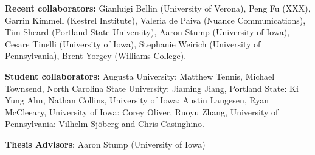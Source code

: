 \textbf{Recent collaborators:} Gianluigi Bellin (University of
Verona), Peng Fu (XXX), Garrin Kimmell (Kestrel Institute), Valeria de
Paiva (Nuance Communications), Tim Sheard (Portland State University),
Aaron Stump (University of Iowa), Cesare Tinelli (University of Iowa),
Stephanie Weirich (University of Pennsylvania), Brent Yorgey (Williams
College).

\textbf{Student collaborators:} Augusta University: Matthew Tennis,
Michael Townsend, North Carolina State University: Jiaming Jiang,
Portland State: Ki Yung Ahn, Nathan Collins, University of Iowa:
Austin Laugesen, Ryan McCleeary, University of Iowa: Corey Oliver,
Ruoyu Zhang, University of Pennsylvania: Vilhelm Sj{\"o}berg and Chris
Casinghino.


\textbf{Thesis Advisors}: Aaron Stump (University of Iowa)
